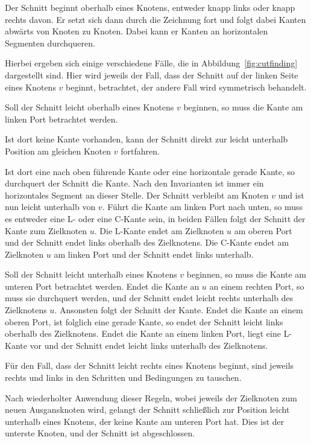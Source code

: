 \documentclass[a4paper]{scrreprt}
\theoremstyle{definition}
\begin{document}
Der Schnitt beginnt oberhalb eines Knotens, entweder knapp links oder knapp rechts davon. Er setzt sich dann durch die Zeichnung fort und folgt dabei Kanten abwärts von Knoten zu Knoten. Dabei kann er Kanten an horizontalen Segmenten durchqueren.

Hierbei ergeben sich einige verschiedene Fälle, die in Abbildung~\ref{fig:cutfinding} dargestellt sind. Hier wird jeweils der Fall, dass der Schnitt auf der linken Seite eines Knotens $v$ beginnt, betrachtet, der andere Fall wird symmetrisch behandelt. 

Soll der Schnitt leicht oberhalb eines Knotens $v$ beginnen, so muss die Kante am linken Port betrachtet werden.

Ist dort keine Kante vorhanden, kann der Schnitt direkt zur leicht unterhalb Position am gleichen Knoten $v$ fortfahren.

Ist dort eine nach oben führende Kante oder eine horizontale gerade Kante, so durchquert der Schnitt die Kante. Nach den Invarianten ist immer ein horizontales Segment an dieser Stelle. Der Schnitt verbleibt am Knoten $v$ und ist nun leicht unterhalb von $v$. Führt die Kante am linken Port nach unten, so muss es entweder eine L- oder eine C-Kante sein, in beiden Fällen folgt der Schnitt der Kante zum Zielknoten $u$. Die L-Kante endet am Zielknoten $u$ am oberen Port und der Schnitt endet links oberhalb des Zielknotens. Die C-Kante endet am Zielknoten $u$ am linken Port und der Schnitt endet links unterhalb.

Soll der Schnitt leicht unterhalb eines Knotens $v$ beginnen, so muss die Kante am unteren Port betrachtet werden. Endet die Kante an $u$ an einem rechten Port, so muss sie durchquert werden, und der Schnitt endet leicht rechts unterhalb des Zielknotens $u$. Ansonsten folgt der Schnitt der Kante. Endet die Kante an einem oberen Port, ist folglich eine gerade Kante, so endet der Schnitt leicht links oberhalb des Zielknotens. Endet die Kante an einem linken Port, liegt eine L-Kante vor und der Schnitt endet leicht links unterhalb des Zielknotens.

Für den Fall, dass der Schnitt leicht rechts eines Knotens beginnt, sind jeweils rechts und links in den Schritten und Bedingungen zu tauschen.

Nach wiederholter Anwendung dieser Regeln, wobei jeweils der Zielknoten zum neuen Ausgansknoten wird, gelangt der Schnitt schließlich zur Position leicht unterhalb eines Knotens, der keine Kante am unteren Port hat. Dies ist der unterste Knoten, und der Schnitt ist abgeschlossen.
\end{document}
